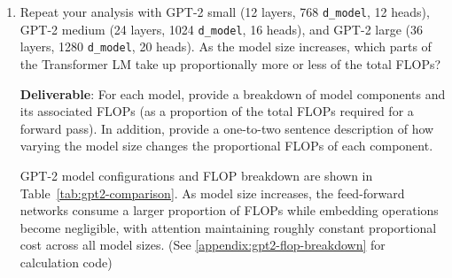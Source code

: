 \begin{enumerate}[label=(\alph*)]
    \item Repeat your analysis with GPT-2 small (12 layers, 768 \lstinline{d_model}, 12 heads), GPT-2 medium (24 layers, 1024 \lstinline{d_model}, 16 heads), and GPT-2 large (36 layers, 1280 \lstinline{d_model}, 20 heads). As the model size increases, which parts of the Transformer LM take up proportionally more or less of the total FLOPs?
    
    \textbf{Deliverable}: For each model, provide a breakdown of model components and its associated FLOPs (as a proportion of the total FLOPs required for a forward pass). In addition, provide a one-to-two sentence description of how varying the model size changes the proportional FLOPs of each component.
    
    \begin{answer}
    GPT-2 model configurations and FLOP breakdown are shown in Table~\ref{tab:gpt2-comparison}. 
    As model size increases, the feed-forward networks consume a larger proportion of FLOPs while embedding operations become negligible, with attention maintaining roughly constant proportional cost across all model sizes. (See \ref{appendix:gpt2-flop-breakdown} for calculation code)
    \end{answer}
    

\end{enumerate}
